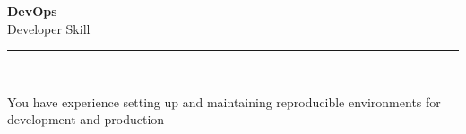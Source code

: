 \documentclass[11pt,a4paper]{memoir}
\begin{document}
    \begin{Spacing}{0.75}%
        \noindent
        \Large
        \textbf{DevOps}\\[3pt]
        \scriptsize\color{gray}Developer Skill\\ 
        \rule{\textwidth}{.3mm}\\
        
        \vspace{3mm}
        \noindent
        \begin{minipage}[t]{53mm}
            \begin{flushleft}
            {
                \normalsize
                \begin{Spacing}{1}%
                \color{black}\textrm{You have experience setting up and maintaining reproducible environments for development and production}\\
                \end{Spacing}
            }
            \end{flushleft}
        \end{minipage}

        \vspace{5mm}
        \noindent
        \begin{minipage}[t]{53mm}
            \begin{flushleft}
            {
                \normalsize
                \begin{Spacing}{1}%
                \color{gray}\textit{}\\
                \end{Spacing}
            }
            \end{flushleft}
        \end{minipage}
    \end{Spacing}
    \clearpage
\end{document}
